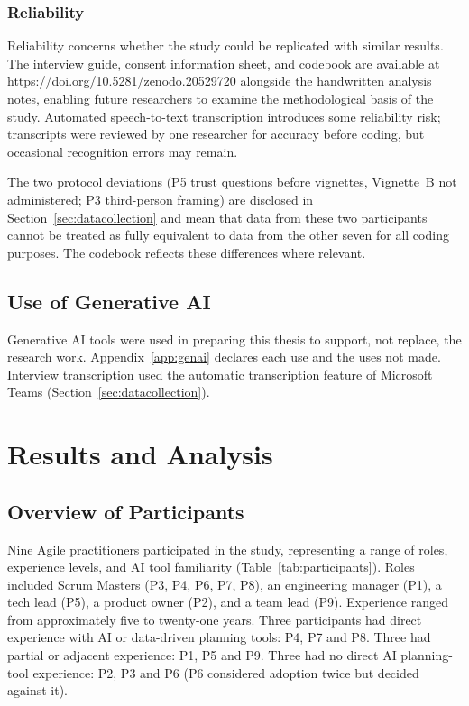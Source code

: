 \documentclass[a4paper,twoside]{bth}
\begin{document}
\subsection{Reliability}

Reliability concerns whether the study could be replicated with similar results. The interview guide, consent information sheet, and codebook are available at \url{https://doi.org/10.5281/zenodo.20529720} alongside the handwritten analysis notes, enabling future researchers to examine the methodological basis of the study. Automated speech-to-text transcription introduces some reliability risk; transcripts were reviewed by one researcher for accuracy before coding, but occasional recognition errors may remain.

The two protocol deviations (P5 trust questions before vignettes, Vignette~B not administered; P3 third-person framing) are disclosed in Section~\ref{sec:datacollection} and mean that data from these two participants cannot be treated as fully equivalent to data from the other seven for all coding purposes. The codebook reflects these differences where relevant.

\section{Use of Generative AI}

Generative AI tools were used in preparing this thesis to support, not replace, the research work. Appendix~\ref{app:genai} declares each use and the uses not made. Interview transcription used the automatic transcription feature of Microsoft Teams (Section~\ref{sec:datacollection}).

\chapter{Results and Analysis}
\label{chp:results}

\section{Overview of Participants}

Nine Agile practitioners participated in the study, representing a range of roles, experience levels, and AI tool familiarity (Table~\ref{tab:participants}). Roles included Scrum Masters (P3, P4, P6, P7, P8), an engineering manager (P1), a tech lead (P5), a product owner (P2), and a team lead (P9). Experience ranged from approximately five to twenty-one years. Three participants had direct experience with AI or data-driven planning tools: P4, P7 and P8. Three had partial or adjacent experience: P1, P5 and P9. Three had no direct AI planning-tool experience: P2, P3 and P6 (P6 considered adoption twice but decided against it).
\end{document}

